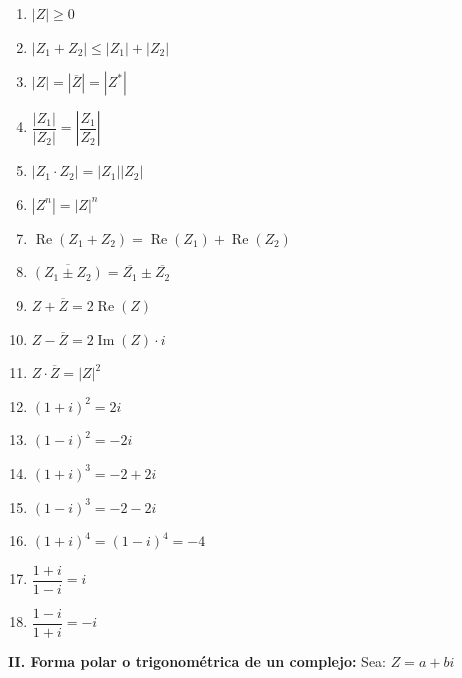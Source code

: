 \documentclass[11pt,a4paper]{article}
\begin{document}
\begin{minipage}[t]{0.320\textwidth}
\begin{enumerate}
  \item $|Z| \geq 0$
  \item $|Z_1 + Z_2| \leq |Z_1| + |Z_2|$
  \item $|Z| = |\overline{Z}| = |Z^*|$
  \item $\dfrac{|Z_1|}{|Z_2|} = \left|\dfrac{Z_1}{Z_2}\right|$
  \item $|Z_1\cdot Z_2| = |Z_1||Z_2|$
  \item $|Z^n| = |Z|^n$
\end{enumerate}
\end{minipage}\hfill
\begin{minipage}[t]{0.359\textwidth}
\begin{enumerate}\setcounter{enumi}{6}
  \item $\operatorname{Re}(Z_1 + Z_2) = \operatorname{Re}(Z_1) + \operatorname{Re}(Z_2)$
  \item $\overline{(Z_1 \pm Z_2)} = \overline{Z_1} \pm \overline{Z_2}$
  \item $Z + \overline{Z} = 2\operatorname{Re}(Z)$
  \item $Z - \overline{Z} = 2\operatorname{Im}(Z)\cdot i$
  \item $Z\cdot\overline{Z} = |Z|^2$
  \item $(1 + i)^2 = 2i$
\end{enumerate}
\end{minipage}\hfill
\begin{minipage}[t]{0.291\textwidth}
\begin{enumerate}\setcounter{enumi}{12}
  \item $(1 - i)^2 = -2i$
  \item $(1 + i)^3 = -2 + 2i$
  \item $(1 - i)^3 = -2 - 2i$
  \item $(1 + i)^4 = (1 - i)^4 = -4$
  \item $\dfrac{1 + i}{1 - i} = i$
  \item $\dfrac{1 - i}{1 + i} = -i$
\end{enumerate}
\end{minipage}

\medskip
\textbf{II. Forma polar o trigonométrica de un complejo:} Sea: $Z = a + bi$
\end{document}
